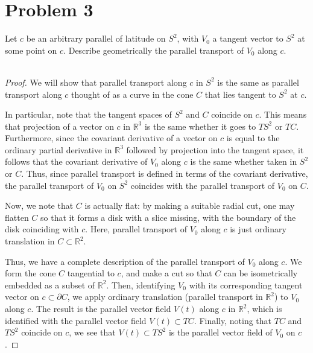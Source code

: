 \documentclass[fontsize=11pt]{scrartcl} %
\numberwithin{equation}{section} %
\numberwithin{figure}{section} %
\numberwithin{table}{section} %
\newcommand{\R}{\mathbb{R}}
\begin{document}
\section*{Problem 3}
Let $c$ be an arbitrary parallel of latitude on $S^2$, with $V_0$ a tangent
vector to $S^2$ at some point on $c$. Describe geometrically the parallel
transport of $V_0$ along $c$.
\\
\\
\begin{proof}
    We will show that parallel transport along $c$ in $S^2$ is the same as
    parallel transport along $c$ thought of as a curve in the cone $C$ that lies
    tangent to $S^2$ at $c$.

    In particular, note that the tangent spaces of $S^2$ and $C$ coincide on
    $c$. This means that projection of a vector on $c$ in $\R^3$ is the same
    whether it goes to $TS^2$ or $TC$. Furthermore, since the covariant
    derivative of a vector on $c$ is equal to the ordinary partial derivative in
    $\R^3$ followed by projection into the tangent space, it follows that the
    covariant derivative of $V_0$ along $c$ is the same whether taken in $S^2$
    or $C$. Thus, since parallel transport is defined in terms of the covariant
    derivative, the parallel transport of $V_0$ on $S^2$ coincides with the
    parallel transport of $V_0$ on $C$.

    Now, we note that $C$ is actually flat: by making a suitable radial cut, one
    may flatten $C$ so that it forms a disk with a slice missing, with the
    boundary of the disk coinciding with $c$. Here, parallel transport of $V_0$
    along $c$ is just ordinary translation in $C\subset \R^2$.

    Thus, we have a complete description of the parallel transport of $V_0$
    along $c$. We form the cone $C$ tangential to $c$, and make a cut so that
    $C$ can be isometrically embedded as a subset of $\R^2$. Then, identifying
    $V_0$ with its corresponding tangent vector on $c \subset \partial C$, we
    apply ordinary translation (parallel transport in $\R^2$) to $V_0$ along
    $c$. The result is the parallel vector field $V(t)$ along $c$ in $\R^2$,
    which is identified with the parallel vector field $V(t)\subset TC$.
    Finally, noting that $TC$ and $TS^2$ coincide on $c$, we see that
    $V(t)\subset TS^2$ is the parallel vector field of $V_0$ on $c$.
\end{proof}

\newpage
\end{document}
